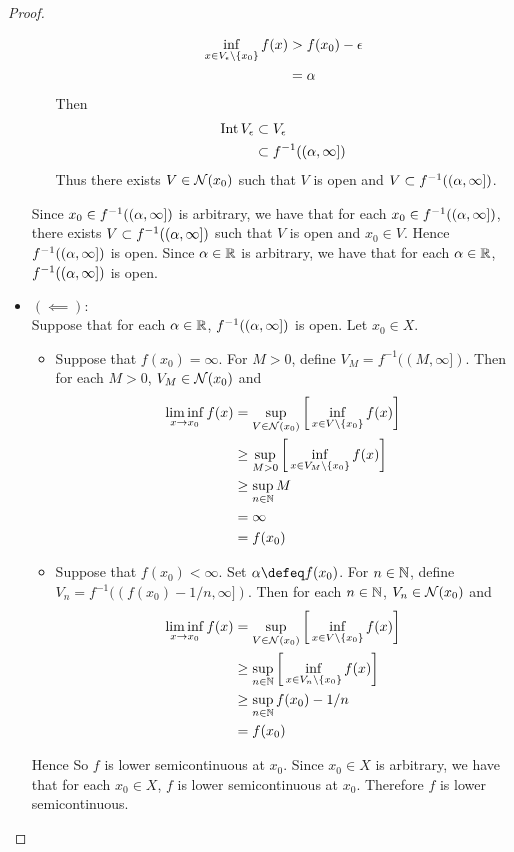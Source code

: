 \documentclass{book}
\begin{document}
\begin{proof}
\begin{itemize}
\begin{itemize}
\begin{align*}
				\inf_{x \in V_{\epsilon} \setminus \{x_0\}} f(x)  
				&> f(x_0) - \epsilon \\
				&= \alpha
			\end{align*}
			Then
			\begin{align*}
				\operatorname{Int} V_{\epsilon} 
				& \subset V_{\epsilon} \\
				&\subset f^{-1}((\alpha, \infty])
			\end{align*} 
			Thus there exists $V \in \mathcal{N}(x_0)$ such that $V$ is open and $V \subset f^{-1}((\alpha, \infty])$.
		\end{itemize}
		Since $x_0 \in f^{-1}((\alpha, \infty])$ is arbitrary, we have that for each $x_0 \in f^{-1}((\alpha, \infty])$, there exists $V \subset f^{-1}((\alpha, \infty])$ such that $V$ is open and $x_0 \in V$. Hence $f^{-1}((\alpha, \infty])$ is open. Since $\alpha \in \mathbb{R}$ is arbitrary, we have that for each $\alpha \in \mathbb{R}$, $f^{-1}((\alpha, \infty])$ is open.
		\item $(\impliedby):$ \\ 
		Suppose that for each $\alpha \in \mathbb{R}$, $f^{-1}((\alpha, \infty])$ is open. Let $x_0 \in X$. 
		\begin{itemize}
			\item Suppose that $f(x_0) = \infty$.  For $M > 0$, define $V_M = f^{-1}((M, \infty]) $. Then for each $M > 0$, $V_M \in \mathcal{N}(x_0)$ and 
			\begin{align*}
				\liminf_{x \rightarrow x_0} f(x) 
				&= \sup_{V \in \mathcal{N}(x_0)} \bigg[ \inf_{x \in V \setminus \{x_0\}} f(x) \bigg] \\
				& \geq \sup_{M > 0} \bigg[ \inf_{x \in V_M \setminus \{x_0\}} f(x) \bigg] \\
				& \geq \sup_{n \in \mathbb{N}} M \\
				& = \infty \\
				&= f(x_0) 
			\end{align*}
			\item Suppose that $f(x_0) < \infty$. Set $\al \defeq f(x_0)$. For $n \in \mathbb{N}$, define $V_n = f^{-1}((f(x_0)-1/n, \infty]) $. Then for each $n \in \mathbb{N}$, $V_n \in \mathcal{N}(x_0)$ and 
			\begin{align*}
				\liminf_{x \rightarrow x_0} f(x) 
				&= \sup_{V \in \mathcal{N}(x_0)} \bigg[ \inf_{x \in V \setminus \{x_0\}} f(x) \bigg] \\
				& \geq \sup_{n \in \mathbb{N}} \bigg[ \inf_{x \in V_n \setminus \{x_0\}} f(x) \bigg] \\
				& \geq \sup_{n \in \mathbb{N}} f(x_0)-1/n \\
				&= f(x_0) 
			\end{align*}
		\end{itemize}
		Hence So $f$ is lower semicontinuous at $x_0$. Since $x_0 \in X$ is arbitrary, we have that for each $x_0 \in X$, $f$ is lower semicontinuous at $x_0$. Therefore $f$ is lower semicontinuous.
	\end{itemize}
	\end{proof}
\end{document}
